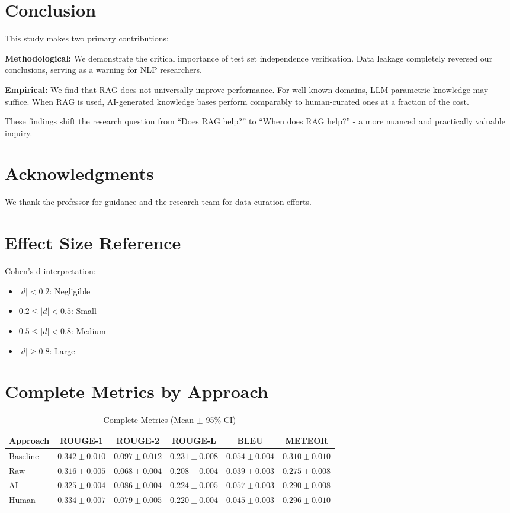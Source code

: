 \documentclass{article}
\begin{document}
\section{Conclusion}

This study makes two primary contributions:

\textbf{Methodological:} We demonstrate the critical importance of test set independence verification. Data leakage completely reversed our conclusions, serving as a warning for NLP researchers.

\textbf{Empirical:} We find that RAG does not universally improve performance. For well-known domains, LLM parametric knowledge may suffice. When RAG is used, AI-generated knowledge bases perform comparably to human-curated ones at a fraction of the cost.

These findings shift the research question from ``Does RAG help?'' to ``When does RAG help?'' - a more nuanced and practically valuable inquiry.

\section*{Acknowledgments}
We thank the professor for guidance and the research team for data curation efforts.

\appendix
\section{Effect Size Reference}

Cohen's d interpretation:
\begin{itemize}
    \item $|d| < 0.2$: Negligible
    \item $0.2 \leq |d| < 0.5$: Small
    \item $0.5 \leq |d| < 0.8$: Medium
    \item $|d| \geq 0.8$: Large
\end{itemize}

\section{Complete Metrics by Approach}

\begin{table}[h]
\centering
\caption{Complete Metrics (Mean $\pm$ 95\% CI)}
\begin{tabular}{lccccc}
\toprule
Approach & ROUGE-1 & ROUGE-2 & ROUGE-L & BLEU & METEOR \\
\midrule
Baseline & $0.342 \pm 0.010$ & $0.097 \pm 0.012$ & $0.231 \pm 0.008$ & $0.054 \pm 0.004$ & $0.310 \pm 0.010$ \\
Raw & $0.316 \pm 0.005$ & $0.068 \pm 0.004$ & $0.208 \pm 0.004$ & $0.039 \pm 0.003$ & $0.275 \pm 0.008$ \\
AI & $0.325 \pm 0.004$ & $0.086 \pm 0.004$ & $0.224 \pm 0.005$ & $0.057 \pm 0.003$ & $0.290 \pm 0.008$ \\
Human & $0.334 \pm 0.007$ & $0.079 \pm 0.005$ & $0.220 \pm 0.004$ & $0.045 \pm 0.003$ & $0.296 \pm 0.010$ \\
\bottomrule
\end{tabular}
\label{tab:complete}
\end{table}
\end{document}
